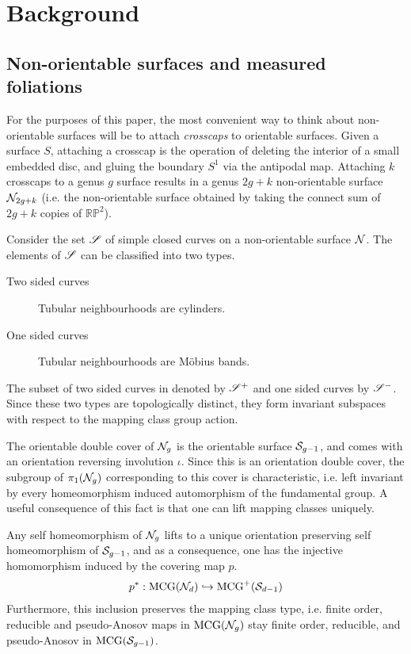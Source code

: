 \documentclass[12pt, reqno]{amsart}
\begin{document}
\section{Background}
\label{sec:background}

\subsection{Non-orientable surfaces and measured foliations}
\label{sec:backgr-meas-foli}

For the purposes of this paper, the most convenient way to think about non-orientable surfaces will be to attach \emph{crosscaps} to orientable surfaces.
Given a surface $S$, attaching a crosscap is the operation of deleting the interior of a small embedded disc, and gluing the boundary $S^1$ via the antipodal map.
Attaching $k$ crosscaps to a genus $g$ surface results in a genus $2g+k$ non-orientable surface $\mathcal{N}_{2g+k}$ (i.e. the non-orientable surface obtained by taking the connect sum of $2g+k$ copies of $\mathbb{RP}^2$).

Consider the set $\mathscr{S}$ of simple closed curves on a non-orientable surface $\mathcal{N}$.
The elements of $\mathscr{S}$ can be classified into two types.
\begin{description}
\item[Two sided curves] Tubular neighbourhoods are cylinders.
\item[One sided curves] Tubular neighbourhoods are Möbius bands.
\end{description}
The subset of two sided curves in denoted by $\mathscr{S}^+$ and one sided curves by $\mathscr{S}^-$.
Since these two types are topologically distinct, they form invariant subspaces with respect to the mapping class group action.

The orientable double cover of $\mathcal{N}_g$ is the orientable surface $\mathcal{S}_{g-1}$, and comes with an orientation reversing involution $\iota$.
Since this is an orientation double cover, the subgroup of $\pi_1(\mathcal{N}_g)$ corresponding to this cover is characteristic, i.e. left invariant by every homeomorphism induced automorphism of the fundamental group.
A useful consequence of this fact is that one can lift mapping classes uniquely.
\begin{fact}
  Any self homeomorphism of $\mathcal{N}_g$ lifts to a unique orientation preserving self homeomorphism of $\mathcal{S}_{g-1}$, and as a consequence, one has the injective homomorphism induced by the covering map $p$.
  \begin{align*}
    p^{\ast}: \mathrm{MCG}(\mathcal{N}_d) \hookrightarrow \mathrm{MCG}^+(\mathcal{S}_{d-1})
  \end{align*}
  Furthermore, this inclusion preserves the mapping class type, i.e. finite order, reducible and pseudo-Anosov maps in $\mathrm{MCG}(\mathcal{N}_g)$ stay finite order, reducible, and pseudo-Anosov in $\mathrm{MCG}(\mathcal{S}_{g-1})$.
\end{fact}
\end{document}
